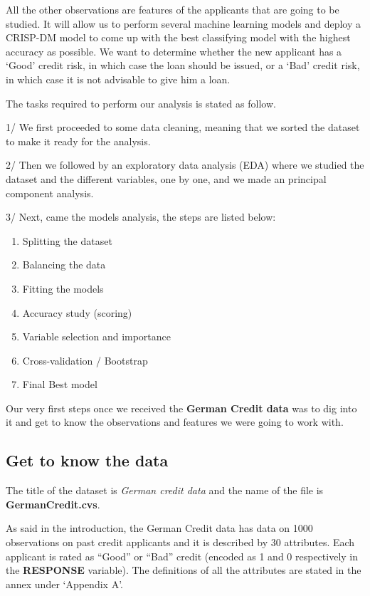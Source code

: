 \documentclass[
]{article}
\providecommand{\tightlist}{%
  \setlength{\itemsep}{0pt}\setlength{\parskip}{0pt}}
\begin{document}
All the other observations are features of the applicants that are going
to be studied. It will allow us to perform several machine learning
models and deploy a CRISP-DM model to come up with the best classifying
model with the highest accuracy as possible. We want to determine
whether the new applicant has a `Good' credit risk, in which case the
loan should be issued, or a `Bad' credit risk, in which case it is not
advisable to give him a loan.

The tasks required to perform our analysis is stated as follow.

1/ We first proceeded to some data cleaning, meaning that we sorted the
dataset to make it ready for the analysis.

2/ Then we followed by an exploratory data analysis (EDA) where we
studied the dataset and the different variables, one by one, and we made
an principal component analysis.

3/ Next, came the models analysis, the steps are listed below:

\begin{enumerate}
\def\labelenumi{\alph{enumi})}
\tightlist
\item
  Splitting the dataset
\item
  Balancing the data
\item
  Fitting the models
\item
  Accuracy study (scoring)
\item
  Variable selection and importance
\item
  Cross-validation / Bootstrap
\item
  Final Best model
\end{enumerate}

Our very first steps once we received the \textbf{German Credit data}
was to dig into it and get to know the observations and features we were
going to work with.

\hypertarget{get-to-know-the-data}{%
\subsection{Get to know the data}\label{get-to-know-the-data}}

The title of the dataset is \emph{German credit data} and the name of
the file is \textbf{GermanCredit.cvs}.

As said in the introduction, the German Credit data has data on 1000
observations on past credit applicants and it is described by 30
attributes. Each applicant is rated as ``Good'' or ``Bad'' credit
(encoded as 1 and 0 respectively in the \textbf{RESPONSE} variable). The
definitions of all the attributes are stated in the annex under
`Appendix A'.
\end{document}
